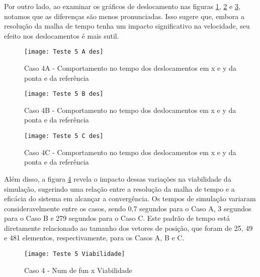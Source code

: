Por outro lado, ao examinar os gráficos de deslocamento nas figuras \ref{fig:t_5a_des}, \ref{fig:t_5b_des} e \ref{fig:t_5c_des}, notamos que as diferenças são menos pronunciadas. Isso sugere que, embora a resolução da malha de tempo tenha um impacto significativo na velocidade, seu efeito nos deslocamentos é mais sutil.

\begin{figure}[H]
    \begin{center}
    \caption{Caso 4A - Comportamento no tempo dos deslocamentos em x e y da ponta e da referência}
    \texttt{[image: Teste 5 A des]}
    \label{fig:t_5a_des}
    \end{center}
\end{figure}

\begin{figure}[H]
    \begin{center}
    \caption{Caso 4B - Comportamento no tempo dos deslocamentos em x e y da ponta e da referência}
    \texttt{[image: Teste 5 B des]}
    \label{fig:t_5b_des}
    \end{center}
\end{figure}

\begin{figure}[H]
    \begin{center}
    \caption{Caso 4C - Comportamento no tempo dos deslocamentos em x e y da ponta e da referência}
    \texttt{[image: Teste 5 C des]}
    \label{fig:t_5c_des}
    \end{center}
\end{figure}

Além disso, a figura \ref{fig:t_5_viab} revela o impacto dessas variações na viabilidade da simulação, sugerindo uma relação entre a resolução da malha de tempo e a eficácia do sistema em alcançar a convergência. Os tempos de simulação variaram consideravelmente entre os casos, sendo 0,7 segundos para o Caso A, 3 segundos para o Caso B e 279 segundos para o Caso C. Este padrão de tempo está diretamente relacionado ao tamanho dos vetores de posição, que foram de 25, 49 e 481 elementos, respectivamente, para os Casos A, B e C.

\begin{figure}[H]
    \begin{center}
    \caption{Caso 4 - Num de fun x Viabilidade}
    \texttt{[image: Teste 5 Viabilidade]}
    \label{fig:t_5_viab}
    \end{center}
\end{figure}

